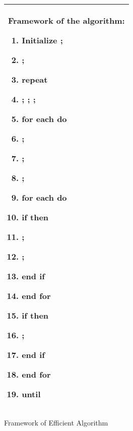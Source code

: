 \documentclass{llncs}
\begin{document}
\begin{figure}[tbp]

\begin{center}
 \begin{tabular}{|p{12cm}|}\hline\vspace{0ex}

\textbf{\normalsize  Framework of the algorithm:}

\begin{enumerate}
\item
Initialize ;

\item
;

\item
\textbf{repeat}

\item
\qquad
;
;
;

\item
\qquad \textbf{for} each  \textbf{do}

\item
\qquad\qquad
;

\item
\qquad\qquad ;

\item
\qquad\qquad ;

\item
\qquad\qquad  \textbf{for} each  \textbf{do}

\item
\qquad\qquad\qquad
\textbf{if} 
\textbf{then}


\item
\qquad\qquad\qquad\qquad
;

\item
\qquad\qquad\qquad\qquad
;

\item
\qquad\qquad\qquad
\textbf{end if}

\item
\qquad\qquad
\textbf{end for}

\item
\qquad\qquad
\textbf{if}  \textbf{then}

\item
\qquad\qquad\qquad
;

\item
\qquad\qquad
\textbf{end if}

\item
\qquad
\textbf{end for}

\item
\textbf{until}  \vspace{-1ex}
\end{enumerate}\\
        \hline
    \end{tabular}\vspace{-1ex}
\end{center}
\caption{Framework of Efficient Algorithm}\label{Efficient_Algorithm}
\end{figure}
\end{document}
